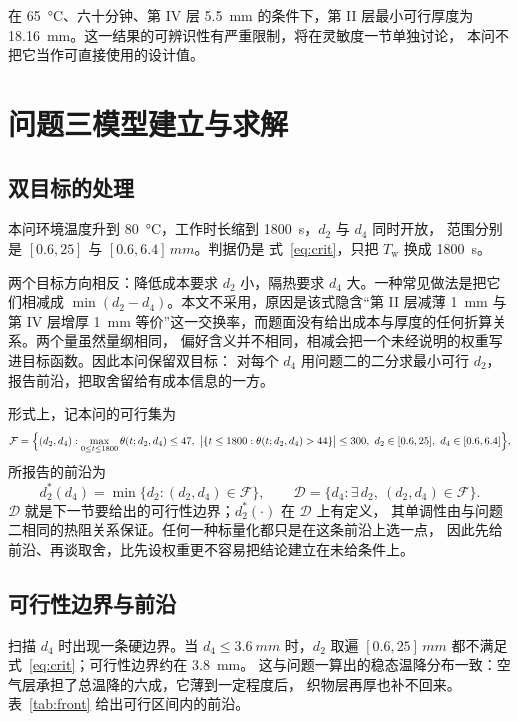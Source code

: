 \documentclass[withoutpreface,bwprint]{cumcmthesis}
\begin{document}
在 \SI{65}{\celsius}、六十分钟、第 IV 层 \SI{5.5}{mm} 的条件下，第 II 层最小可行厚度为
\SI{18.16}{mm}。这一结果的可辨识性有严重限制，将在灵敏度一节单独讨论，
本问不把它当作可直接使用的设计值。

\section{问题三模型建立与求解}
\label{mcm-q2-end}
\label{mcm-q3-start}

\subsection{双目标的处理}

本问环境温度升到 \SI{80}{\celsius}，工作时长缩到 \SI{1800}{s}，$d_2$ 与 $d_4$ 同时开放，
范围分别是 $[\num{0.6},\num{25}]$ 与 $[\num{0.6},\num{6.4}]\,\si{mm}$。判据仍是
式~\eqref{eq:crit}，只把 $T_{\mathrm{w}}$ 换成 \SI{1800}{s}。

两个目标方向相反：降低成本要求 $d_2$ 小，隔热要求 $d_4$ 大。一种常见做法是把它们相减成
$\min(d_2-d_4)$。本文不采用，原因是该式隐含“第 II 层减薄 \SI{1}{mm} 与第 IV 层增厚
\SI{1}{mm} 等价”这一交换率，而题面没有给出成本与厚度的任何折算关系。两个量虽然量纲相同，
偏好含义并不相同，相减会把一个未经说明的权重写进目标函数。因此本问保留双目标：
对每个 $d_4$ 用问题二的二分求最小可行 $d_2$，报告前沿，把取舍留给有成本信息的一方。

形式上，记本问的可行集为
\begin{equation}
  \mathcal{F}=\Bigl\{(d_2,d_4):
  \max_{0\le t\le 1800}\theta(t;d_2,d_4)\le 47,\
  \bigl|\{t\le 1800:\theta(t;d_2,d_4)>44\}\bigr|\le 300,\
  d_2\in[0.6,25],\ d_4\in[0.6,6.4]\Bigr\},
  \label{eq:feas3}
\end{equation}
所报告的前沿为
\begin{equation}
  d_2^{*}(d_4)=\min\{d_2:(d_2,d_4)\in\mathcal{F}\},
  \qquad
  \mathcal{D}=\{d_4: \exists\,d_2,\ (d_2,d_4)\in\mathcal{F}\}.
  \label{eq:front3}
\end{equation}
$\mathcal{D}$ 就是下一节要给出的可行性边界；$d_2^{*}(\cdot)$ 在 $\mathcal{D}$ 上有定义，
其单调性由与问题二相同的热阻关系保证。任何一种标量化都只是在这条前沿上选一点，
因此先给前沿、再谈取舍，比先设权重更不容易把结论建立在未给条件上。

\subsection{可行性边界与前沿}

扫描 $d_4$ 时出现一条硬边界。当 $d_4\le\SI{3.6}{mm}$ 时，$d_2$ 取遍
$[\num{0.6},\num{25}]\,\si{mm}$ 都不满足式~\eqref{eq:crit}；可行性边界约在 \SI{3.8}{mm}。
这与问题一算出的稳态温降分布一致：空气层承担了总温降的六成，它薄到一定程度后，
织物层再厚也补不回来。表~\ref{tab:front} 给出可行区间内的前沿。
\end{document}
